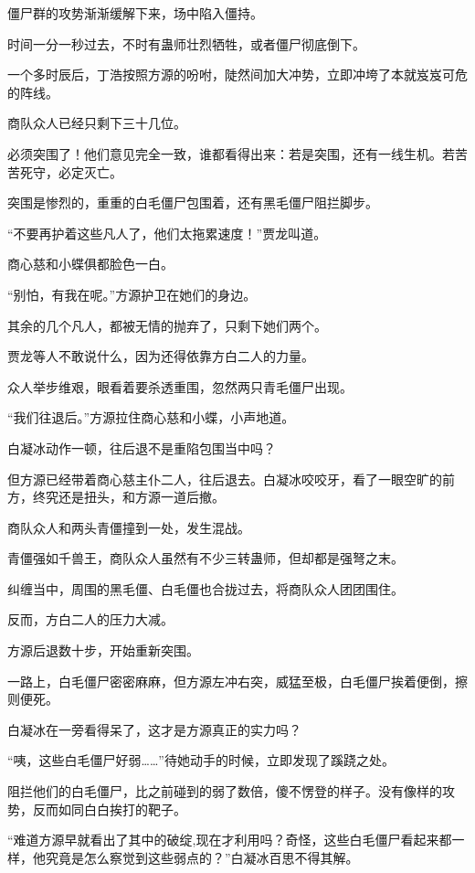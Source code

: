 
\begin{this_body}

僵尸群的攻势渐渐缓解下来，场中陷入僵持。

时间一分一秒过去，不时有蛊师壮烈牺牲，或者僵尸彻底倒下。

一个多时辰后，丁浩按照方源的吩咐，陡然间加大冲势，立即冲垮了本就岌岌可危的阵线。

商队众人已经只剩下三十几位。

必须突围了！他们意见完全一致，谁都看得出来：若是突围，还有一线生机。若苦苦死守，必定灭亡。

突围是惨烈的，重重的白毛僵尸包围着，还有黑毛僵尸阻拦脚步。

“不要再护着这些凡人了，他们太拖累速度！”贾龙叫道。

商心慈和小蝶俱都脸色一白。

“别怕，有我在呢。”方源护卫在她们的身边。

其余的几个凡人，都被无情的抛弃了，只剩下她们两个。

贾龙等人不敢说什么，因为还得依靠方白二人的力量。

众人举步维艰，眼看着要杀透重围，忽然两只青毛僵尸出现。

“我们往退后。”方源拉住商心慈和小蝶，小声地道。

白凝冰动作一顿，往后退不是重陷包围当中吗？

但方源已经带着商心慈主仆二人，往后退去。白凝冰咬咬牙，看了一眼空旷的前方，终究还是扭头，和方源一道后撤。

商队众人和两头青僵撞到一处，发生混战。

青僵强如千兽王，商队众人虽然有不少三转蛊师，但却都是强弩之末。

纠缠当中，周围的黑毛僵、白毛僵也合拢过去，将商队众人团团围住。

反而，方白二人的压力大减。

方源后退数十步，开始重新突围。

一路上，白毛僵尸密密麻麻，但方源左冲右突，威猛至极，白毛僵尸挨着便倒，擦则便死。

白凝冰在一旁看得呆了，这才是方源真正的实力吗？

“咦，这些白毛僵尸好弱……”待她动手的时候，立即发现了蹊跷之处。

阻拦他们的白毛僵尸，比之前碰到的弱了数倍，傻不愣登的样子。没有像样的攻势，反而如同白白挨打的靶子。

“难道方源早就看出了其中的破绽,现在才利用吗？奇怪，这些白毛僵尸看起来都一样，他究竟是怎么察觉到这些弱点的？”白凝冰百思不得其解。


\end{this_body}
